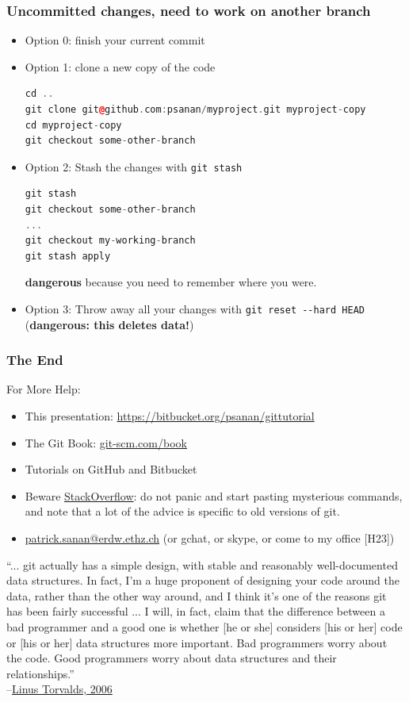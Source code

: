\documentclass{beamer}
\begin{document}
\begin{frame}[fragile]
\frametitle{Uncommitted changes, need to work on another branch}
\begin{itemize}
\item Option 0: finish your current commit
\item Option 1: clone a new copy of the code
\begin{lstlisting}[language=C++]
cd .. 
git clone git@github.com:psanan/myproject.git myproject-copy
cd myproject-copy
git checkout some-other-branch
\end{lstlisting}
\item Option 2: Stash the changes with \lstinline{git stash}
\begin{lstlisting}[language=C++]
git stash
git checkout some-other-branch
...
git checkout my-working-branch
git stash apply
\end{lstlisting}
\textbf{dangerous} because you need to remember where you were.
\item Option 3: Throw away all your changes with \lstinline{git reset --hard HEAD} (\textbf{dangerous: this deletes data!})
\end{itemize}
\end{frame}

\begin{frame}[fragile]
\frametitle{The End}

For More Help:
\begin{itemize}
\item This presentation: \href{https://bitbucket.org/psanan/gittutorial}{https://bitbucket.org/psanan/gittutorial}
\item
The Git Book: \href{https://git-scm.com/book}{git-scm.com/book}
\item 
Tutorials on GitHub and Bitbucket
\item 
Beware \href{https://www.stackoverflow.com}{StackOverflow}: do not panic and start pasting mysterious commands, and note that a lot of the advice is specific to old versions of git.
\item \href{mailto:patrick.sanan@erdw.ethz.ch}{patrick.sanan@erdw.ethz.ch} (or gchat, or skype, or come to my office [H23])
\end{itemize}
\vspace{50px}
{\tiny ``... git actually has a simple design, with stable and reasonably well-documented data structures. 
In fact, I'm a huge proponent of designing your code around the data, rather than the other 
way around, and I think it's one of the reasons git has been fairly successful ... I will, in 
fact, claim that the difference between a bad programmer and a good one is whether [he or she] 
considers [his or her] code or [his or her] data structures more important. Bad programmers worry 
about the code. Good programmers worry about data structures and their relationships.''\\
--\href{http://lwn.net/Articles/193245/}{Linus Torvalds, 2006}
}
\end{frame}
\end{document}
